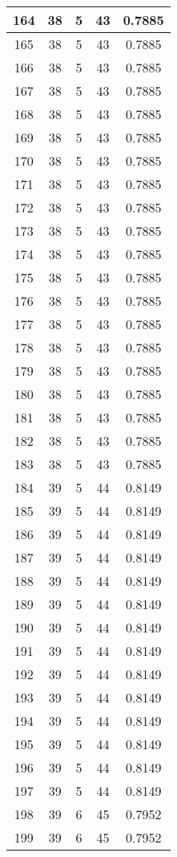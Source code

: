 \documentclass[letterpaper, 12pt]{article}
\begin{document}
\begin{longtable}{|c|c|c|c|c|}
\hline
164 & 38 & 5 & 43 & 0.7885 \\
\hline
165 & 38 & 5 & 43 & 0.7885 \\
\hline
166 & 38 & 5 & 43 & 0.7885 \\
\hline
167 & 38 & 5 & 43 & 0.7885 \\
\hline
168 & 38 & 5 & 43 & 0.7885 \\
\hline
169 & 38 & 5 & 43 & 0.7885 \\
\hline
170 & 38 & 5 & 43 & 0.7885 \\
\hline
171 & 38 & 5 & 43 & 0.7885 \\
\hline
172 & 38 & 5 & 43 & 0.7885 \\
\hline
173 & 38 & 5 & 43 & 0.7885 \\
\hline
174 & 38 & 5 & 43 & 0.7885 \\
\hline
175 & 38 & 5 & 43 & 0.7885 \\
\hline
176 & 38 & 5 & 43 & 0.7885 \\
\hline
177 & 38 & 5 & 43 & 0.7885 \\
\hline
178 & 38 & 5 & 43 & 0.7885 \\
\hline
179 & 38 & 5 & 43 & 0.7885 \\
\hline
180 & 38 & 5 & 43 & 0.7885 \\
\hline
181 & 38 & 5 & 43 & 0.7885 \\
\hline
182 & 38 & 5 & 43 & 0.7885 \\
\hline
183 & 38 & 5 & 43 & 0.7885 \\
\hline
184 & 39 & 5 & 44 & 0.8149 \\
\hline
185 & 39 & 5 & 44 & 0.8149 \\
\hline
186 & 39 & 5 & 44 & 0.8149 \\
\hline
187 & 39 & 5 & 44 & 0.8149 \\
\hline
188 & 39 & 5 & 44 & 0.8149 \\
\hline
189 & 39 & 5 & 44 & 0.8149 \\
\hline
190 & 39 & 5 & 44 & 0.8149 \\
\hline
191 & 39 & 5 & 44 & 0.8149 \\
\hline
192 & 39 & 5 & 44 & 0.8149 \\
\hline
193 & 39 & 5 & 44 & 0.8149 \\
\hline
194 & 39 & 5 & 44 & 0.8149 \\
\hline
195 & 39 & 5 & 44 & 0.8149 \\
\hline
196 & 39 & 5 & 44 & 0.8149 \\
\hline
197 & 39 & 5 & 44 & 0.8149 \\
\hline
198 & 39 & 6 & 45 & 0.7952 \\
\hline
199 & 39 & 6 & 45 & 0.7952 \\
\hline
\end{longtable}
\end{document}
